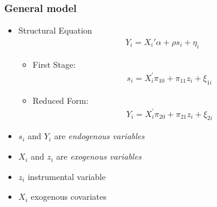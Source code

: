 \documentclass[pdftex]{beamer}
\begin{document}
\begin{frame}
\frametitle{General model}
\begin{itemize}
\item Structural Equation
\begin{eqnarray*}
  Y_{i} = X_{i}' \alpha+ \rho s_{i}+\eta_{i}
\end{eqnarray*}
    \begin {itemize}
       \item First Stage:
      \begin{eqnarray*}
           s_{i}= X_{i}^{'}\pi_{10}+ \pi_{11}z_{i}+ \xi_{1i}
      \end{eqnarray*}

    \item Reduced Form:
        \begin{eqnarray*}
           Y_{i}= X_{i}^{'}\pi_{20}+ \pi_{21}z_{i}+ \xi_{2i}
      \end{eqnarray*}
\end {itemize}
\item $s_{i}$ and $Y_{i}$ are \emph{endogenous variables}
\item $X_{i}$ and $z_{i}$ are \emph{exogenous variables}
\item $z_{i}$ instrumental variable
\item $X_{i}$ exogenous covariates

\end{itemize}
\end{frame}



\end{document}
